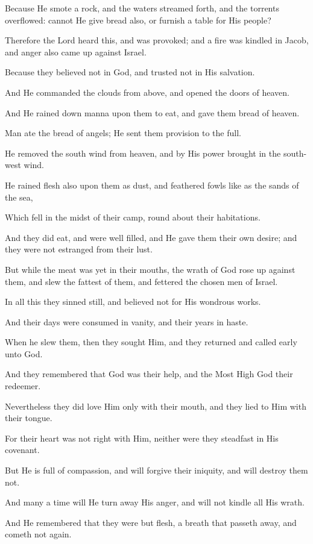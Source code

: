 Because He smote a rock, and the waters streamed forth, and the torrents overflowed: cannot He give bread also, or furnish a table for His people?

Therefore the Lord heard this, and was provoked; and a fire was kindled in Jacob, and anger also came up against Israel.

Because they believed not in God, and trusted not in His salvation.

And He commanded the clouds from above, and opened the doors of heaven.

And He rained down manna upon them to eat, and gave them bread of heaven.

Man ate the bread of angels; He sent them provision to the full.

He removed the south wind from heaven, and by His power brought in the south-west wind.

He rained flesh also upon them as dust, and feathered fowls like as the sands of the sea,

Which fell in the midst of their camp, round about their habitations.

And they did eat, and were well filled, and He gave them their own desire; and they were not estranged from their lust.

But while the meat was yet in their mouths, the wrath of God rose up against them, and slew the fattest of them, and fettered the chosen men of Israel.

In all this they sinned still, and believed not for His wondrous works.

And their days were consumed in vanity, and their years in haste.

When he slew them, then they sought Him, and they returned and called early unto God.

And they remembered that God was their help, and the Most High God their redeemer.

Nevertheless they did love Him only with their mouth, and they lied to Him with their tongue.

For their heart was not right with Him, neither were they steadfast in His covenant.

But He is full of compassion, and will forgive their iniquity, and will destroy them not.

And many a time will He turn away His anger, and will not kindle all His wrath.

And He remembered that they were but flesh, a breath that passeth away, and cometh not again.

